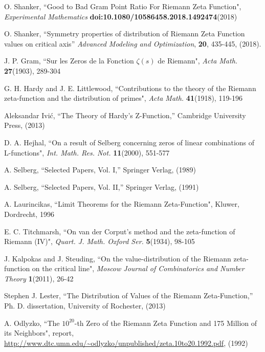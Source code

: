 \documentclass[twoside]{article}
\begin{document}
\begin{thebibliography}{10}
 O. Shanker, 
``Good to Bad Gram Point Ratio For Riemann Zeta Function",
{\it Experimental Mathematics} {\bf doi:10.1080/10586458.2018.1492474}(2018)

 O. Shanker, 
``Symmetry properties of distribution of Riemann Zeta Function values on critical axis''
{\it Advanced Modeling and Optimization}, {\bf 20}, 435-445, (2018). 

 J. P. Gram, 
``Sur les Zeros de la Fonction  $\zeta ( s )$  de Riemann",
{\it Acta Math.} {\bf27}(1903), 289-304



 G. H. Hardy and J. E. Littlewood,
``Contributions to the theory of the Riemann
zeta-function and the distribution of primes",
{\it Acta Math.} {\bf41}(1918), 119-196

 Aleksandar Ivi\'c, ``The Theory of Hardy's Z-Function,''
Cambridge University Press,  (2013)

 D. A. Hejhal,
``On a result of Selberg concerning zeros of linear combinations
of L-functions", 
{\it Int. Math. Res. Not.} {\bf11}(2000), 551-577

 A. Selberg, ``Selected Papers, Vol. I,''
Springer Verlag,  (1989)

 A. Selberg, ``Selected Papers, Vol. II,''
Springer Verlag,  (1991)



 A. Laurincikas,
``Limit Theorems for the Riemann Zeta-Function",
Kluwer, Dordrecht, 1996

 E. C. Titchmarsh,
``On van der Corput's method and the zeta-function of Riemann (IV)",
{\it Quart. J. Math. Oxford Ser.} {\bf5}(1934), 98-105

 J. Kalpokas and J. Steuding,
``On the value-distribution of the Riemann zeta-function on the critical line", 
{\it Moscow Journal of Combinatorics and
Number Theory} {\bf1}(2011), 26-42

 Stephen J. Lester, ``The Distribution of Values of the
Riemann Zeta-Function,''
Ph. D. dissertation, University of Rochester,  (2013)

  A. Odlyzko,
``The $10^{20}$-th Zero of the Riemann Zeta
Function and 175 Million of its Neighbors", report,
\url{http://www.dtc.umn.edu/~odlyzko/unpublished/zeta.10to20.1992.pdf}, (1992)


\end{thebibliography}
\end{document}
